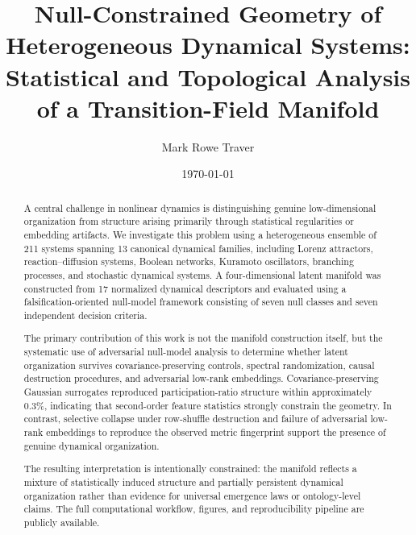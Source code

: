 \documentclass[%
 aip,
 chaos,
 amsmath,amssymb,
 reprint,
]{revtex4-2}
\begin{document}
\title{Null-Constrained Geometry of Heterogeneous Dynamical Systems: Statistical and Topological Analysis of a Transition-Field Manifold}

\author{Mark Rowe Traver}

\date{\today}

\begin{abstract}
A central challenge in nonlinear dynamics is distinguishing genuine low-dimensional organization from structure arising primarily through statistical regularities or embedding artifacts. We investigate this problem using a heterogeneous ensemble of 211 systems spanning 13 canonical dynamical families, including Lorenz attractors, reaction--diffusion systems, Boolean networks, Kuramoto oscillators, branching processes, and stochastic dynamical systems. A four-dimensional latent manifold was constructed from 17 normalized dynamical descriptors and evaluated using a falsification-oriented null-model framework consisting of seven null classes and seven independent decision criteria. 

The primary contribution of this work is not the manifold construction itself, but the systematic use of adversarial null-model analysis to determine whether latent organization survives covariance-preserving controls, spectral randomization, causal destruction procedures, and adversarial low-rank embeddings. Covariance-preserving Gaussian surrogates reproduced participation-ratio structure within approximately 0.3\%, indicating that second-order feature statistics strongly constrain the geometry. In contrast, selective collapse under row-shuffle destruction and failure of adversarial low-rank embeddings to reproduce the observed metric fingerprint support the presence of genuine dynamical organization. 

The resulting interpretation is intentionally constrained: the manifold reflects a mixture of statistically induced structure and partially persistent dynamical organization rather than evidence for universal emergence laws or ontology-level claims. The full computational workflow, figures, and reproducibility pipeline are publicly available.
\end{abstract}

\maketitle
\end{document}
